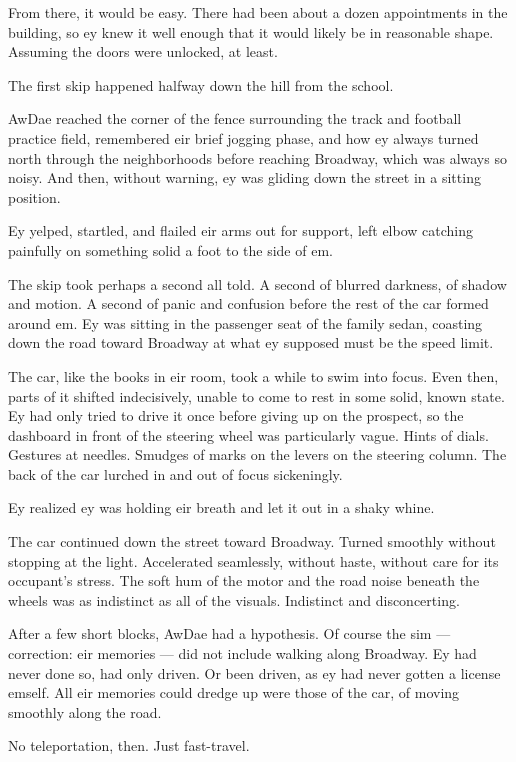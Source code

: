 From there, it would be easy. There had been about a dozen appointments in the building, so ey knew it well enough that it would likely be in reasonable shape. Assuming the doors were unlocked, at least.

The first skip happened halfway down the hill from the school.

AwDae reached the corner of the fence surrounding the track and football practice field, remembered eir brief jogging phase, and how ey always turned north through the neighborhoods before reaching Broadway, which was always so noisy. And then, without warning, ey was gliding down the street in a sitting position.

Ey yelped, startled, and flailed eir arms out for support, left elbow catching painfully on something solid a foot to the side of em.

The skip took perhaps a second all told. A second of blurred darkness, of shadow and motion. A second of panic and confusion before the rest of the car formed around em. Ey was sitting in the passenger seat of the family sedan, coasting down the road toward Broadway at what ey supposed must be the speed limit.

The car, like the books in eir room, took a while to swim into focus. Even then, parts of it shifted indecisively, unable to come to rest in some solid, known state. Ey had only tried to drive it once before giving up on the prospect, so the dashboard in front of the steering wheel was particularly vague. Hints of dials. Gestures at needles. Smudges of marks on the levers on the steering column. The back of the car lurched in and out of focus sickeningly.

Ey realized ey was holding eir breath and let it out in a shaky whine.

The car continued down the street toward Broadway. Turned smoothly without stopping at the light. Accelerated seamlessly, without haste, without care for its occupant's stress. The soft hum of the motor and the road noise beneath the wheels was as indistinct as all of the visuals. Indistinct and disconcerting.

After a few short blocks, AwDae had a hypothesis. Of course the sim — correction: eir memories — did not include walking along Broadway. Ey had never done so, had only driven. Or been driven, as ey had never gotten a license emself. All eir memories could dredge up were those of the car, of moving smoothly along the road.

No teleportation, then. Just fast-travel.

